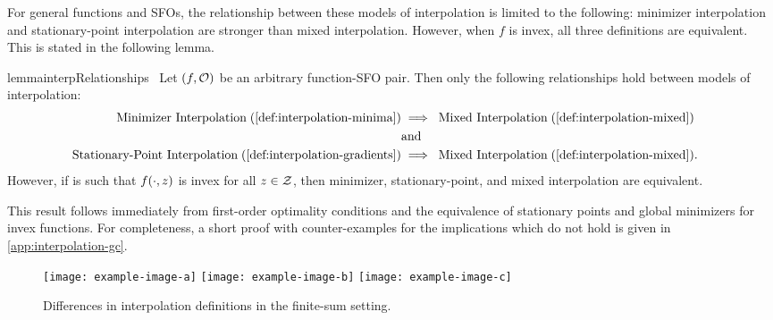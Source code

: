 For general functions and \acp{SFO}, the relationship between these models of interpolation is limited to the following: minimizer interpolation and stationary-point interpolation are stronger than mixed interpolation. 
However, when \( f \) is invex, all three definitions are equivalent.
This is stated in the following lemma.
\begin{restatable}{lemma}{interpRelationships}~\label{thm:interp-relationships}
    Let \( \rbr{f, \oracle{}} \) be an arbitrary function-\ac{SFO} pair. 
    Then only the following relationships hold between models of interpolation:
    \begin{align*}
        \text{Minimizer Interpolation} \; (\autoref{def:interpolation-minima}) &\implies \; \text{Mixed Interpolation} \; (\autoref{def:interpolation-mixed})\\
                                                                               & \text{and} &\\
        \text{Stationary-Point Interpolation} \; (\autoref{def:interpolation-gradients}) &\implies \; \text{Mixed Interpolation} \; (\autoref{def:interpolation-mixed}).
    \end{align*}
    However, if \oracle{} is such that \( f(\cdot, \z) \) is invex for all \( \z \in \calZ \), then minimizer, stationary-point, and mixed interpolation are equivalent.
\end{restatable}
This result follows immediately from first-order optimality conditions and the equivalence of stationary points and global minimizers for invex functions.
For completeness, a short proof with counter-examples for the implications which do not hold is given in \autoref{app:interpolation-gc}.


\begin{figure}[]
    \centering
    \texttt{[image: example-image-a]}
    \texttt{[image: example-image-b]}
    \texttt{[image: example-image-c]}
    \caption{Differences in interpolation definitions in the finite-sum setting.}%
    \label{fig:interpolation-types}
\end{figure}

